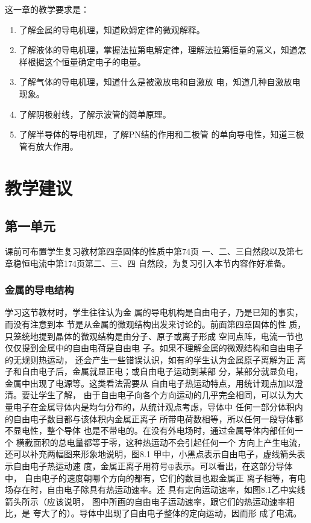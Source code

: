 这一章的教学要求是：
\begin{enumerate}
    \item 了解金属的导电机理，知道欧姆定律的微观解释。
    \item 了解液体的导电机理，掌握法拉第电解定律，理解法拉第恒量的意义，知道怎样根据这个恒量确定电子的电量。
    \item 了解气体的导电机理，知道什么是被激放电和自激放
    电，知道几种自激放电现象。
    \item 了解阴极射线，了解示波管的简单原理。
    \item 了解半导体的导电机理，了解PN结的作用和二极管
    的单向导电性，知道三极管有放大作用。
\end{enumerate}

\section{教学建议}
\subsection{第一单元}
课前可布置学生复习教材第四章固体的性质中第74页
一、二、三自然段以及第七章稳恒电流中第174页第二、三、四
自然段，为复习引入本节内容作好准备。

\subsubsection{金属的导电结构}

学习这节教材时，学生往往认为金
属的导电机构是自由电子，乃是已知的事实，而没有注意到本
节是从金属的微观结构出发来讨论的。前面第四章固体的性
质，只笼统地提到晶体的微观结构是由分子、原子或离子形成
空间点阵，电流一节也仅仅提到金属中的自由电荷是自由电
子。如果不理解金属的微观结构和自由电子的无规则热运动，
还会产生一些错误认识，如有的学生认为金属原子离解为正
离子和自由电子后，金属就显正电；或自由电子运动到某部
分，某部分就显负电，金属中出现了电源等。这类看法需要从
自由电子热运动特点，用统计观点加以澄清。要让学生了解，
由于自由电子向各个方向运动的几乎完全相同，可以认为大
量电子在金属导体内是均匀分布的，从统计观点考虑，导体中
任何一部分体积内的自由电子数目都与该体积内金属正离子
所带电荷数相等，所以任何一段导体都不显电性，整个导体
也是不带电的。在没有外电场时，通过金属导体内部任何一个
横截面积的总电量都等于零，这种热运动不会引起任何一个
方向上产生电流，还可以补充两幅图来形象地说明，图8.1
甲中，小黑点表示自由电子，虚线箭头表示自由电子热运动速
度，金属正离子用符号$\oplus$表示。可以看出，在这部分导体中，
自由电子的速度朝哪个方向的都有，它们的数目也跟金属正
离子相等，有电场存在时，自由电子除具有热运动速率。还
具有定向运动速率，如图8.1乙中实线箭头所示（应该说明，
图中所画的自由电子运动速率，跟它们的热运动速率相比，是
夸大了的）。导体中出现了自由电子整体的定向运动，因而形
成了电流。

